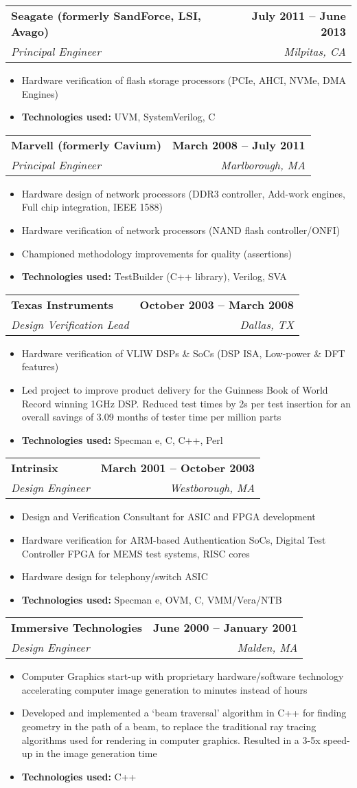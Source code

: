 \documentclass[letterpaper,11pt]{article}
\makeatletter
\newcommand{\resumeItem}[1]{
  \item\small{
    {#1 \vspace{-2pt}}
  }
}
\newcommand{\resumeSubheading}[4]{
  \vspace{-2pt}\item
    \begin{tabular*}{1.0\textwidth}[t]{l@{\extracolsep{\fill}}r}
      \textbf{#1} & \textbf{\small #2} \\
      \textit{\small#3} & \textit{\small #4} \\
    \end{tabular*}\vspace{-7pt}
}
\newcommand{\resumeItemListStart}{\begin{itemize}}
\newcommand{\resumeItemListEnd}{\end{itemize}\vspace{-5pt}}
\makeatother
\begin{document}
    \resumeSubheading
      {Seagate (formerly SandForce, LSI, Avago)}{July 2011 -- June 2013}
      {Principal Engineer}{Milpitas, CA}
      \resumeItemListStart
        \resumeItem{Hardware verification of flash storage processors (PCIe, AHCI, NVMe, DMA Engines)}
        \resumeItem{\textbf{Technologies used:} UVM, SystemVerilog, C}
      \resumeItemListEnd

    \resumeSubheading
      {Marvell (formerly Cavium)}{March 2008 -- July 2011}
      {Principal Engineer}{Marlborough, MA}
      \resumeItemListStart
        \resumeItem{Hardware design of network processors (DDR3 controller, Add-work engines, Full chip integration, IEEE 1588)}
        \resumeItem{Hardware verification of network processors (NAND flash controller/ONFI)}
        \resumeItem{Championed methodology improvements for quality (assertions)}
        \resumeItem{\textbf{Technologies used:} TestBuilder (C++ library), Verilog, SVA}
      \resumeItemListEnd        

    \resumeSubheading
      {Texas Instruments}{October 2003 -- March 2008}
      {Design Verification Lead}{Dallas, TX}
      \resumeItemListStart
        \resumeItem{Hardware verification of VLIW DSPs \& SoCs (DSP ISA, Low-power \& DFT features)}
        \resumeItem{Led project to improve product delivery for the Guinness Book of World Record winning 1GHz DSP. Reduced test times by 2s per test insertion for an overall savings of 3.09 months of tester time per million parts}
        \resumeItem{\textbf{Technologies used:} Specman e, C, C++, Perl}
      \resumeItemListEnd      

    \resumeSubheading
      {Intrinsix}{March 2001 -- October 2003}
      {Design Engineer}{Westborough, MA}
      \resumeItemListStart
        \resumeItem{Design and Verification Consultant for ASIC and FPGA development}
        \resumeItem{Hardware verification for ARM-based Authentication SoCs, Digital Test Controller FPGA for MEMS test systems, RISC cores}
        \resumeItem{Hardware design for telephony/switch ASIC}
        \resumeItem{\textbf{Technologies used:} Specman e, OVM, C, VMM/Vera/NTB}
      \resumeItemListEnd

    \resumeSubheading
      {Immersive Technologies}{June 2000 -- January 2001}
      {Design Engineer}{Malden, MA}
      \resumeItemListStart
        \resumeItem{Computer Graphics start-up with proprietary hardware/software technology accelerating computer image generation to minutes instead of hours}
        \resumeItem{Developed and implemented a ‘beam traversal’ algorithm in C++ for finding geometry in the path of a beam, to replace the traditional ray tracing algorithms used for rendering in computer graphics. Resulted in a 3-5x speed-up in the image generation time}
        \resumeItem{\textbf{Technologies used:} C++}
      \resumeItemListEnd
    
\end{document}

